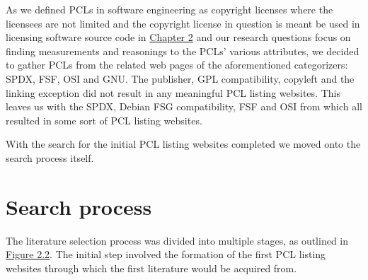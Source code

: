 As we defined PCLs in software engineering as copyright licenses where the licensees are not limited and the copyright license in question is meant be used in licensing software source code in \hyperref[methods]{Chapter 2} and our research questions focus on finding measurements and reasonings to the PCLs' various attributes, we decided to gather PCLs from the related web pages of the aforementioned categorizers: SPDX, FSF, OSI and GNU. The publisher, GPL compatibility, copyleft and the linking exception did not result in any meaningful PCL listing websites. This leaves us with the SPDX, Debian FSG compatibility, FSF and OSI from which all resulted in some sort of PCL listing websites.

With the search for the initial PCL listing websites completed we moved onto the search process itself.

\section{Search process}
The literature selection process was divided into multiple stages, as outlined in \hyperref[fig:search-process]{Figure 2.2}. The initial step involved the formation of the first PCL listing websites through which the first literature would be acquired from.

